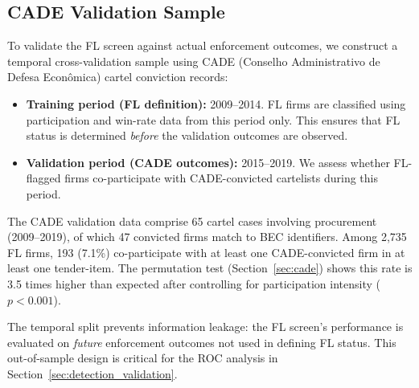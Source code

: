 \subsection{CADE Validation Sample} %
\label{sec:cade_sample}

To validate the FL screen against actual enforcement outcomes, we
construct a temporal cross-validation sample using CADE (Conselho
Administrativo de Defesa Econ\^omica) cartel conviction records:

\begin{itemize}
  \item \textbf{Training period (FL definition):} 2009--2014. FL firms
    are classified using participation and win-rate data from this
    period only. This ensures that FL status is determined
    \emph{before} the validation outcomes are observed.
  \item \textbf{Validation period (CADE outcomes):} 2015--2019. We
    assess whether FL-flagged firms co-participate with CADE-convicted
    cartelists during this period.
\end{itemize}

The CADE validation data comprise 65 cartel cases involving procurement
(2009--2019), of which 47 convicted firms match to BEC identifiers. Among
2,735 FL firms, 193 (7.1\%) co-participate with at least one
CADE-convicted firm in at least one tender-item. The permutation test
(Section~\ref{sec:cade}) shows this rate is 3.5 times higher than
expected after controlling for participation intensity ($p < 0.001$).

The temporal split prevents information leakage: the FL screen's
performance is evaluated on \emph{future} enforcement outcomes not used
in defining FL status. This out-of-sample design is critical for the
ROC analysis in Section~\ref{sec:detection_validation}.
